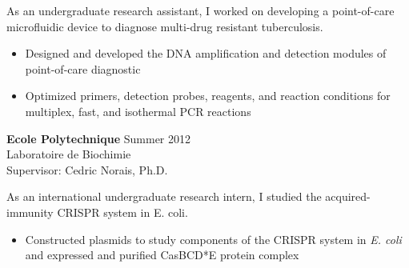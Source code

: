 \documentclass[10pt]{article}
\newenvironment{innerlist}[1][\enskip\textbullet]%
        {\begin{itemize}[#1,leftmargin=*,parsep=0pt,itemsep=0pt,topsep=0pt,partopsep=0pt]}
        {\end{itemize}}
\begin{document}
As an undergraduate research assistant, I worked on developing a point-of-care microfluidic device to diagnose multi-drug resistant tuberculosis. \\

\begin{innerlist}
\item{Designed and developed the DNA amplification and detection modules of point-of-care diagnostic}
\item{Optimized primers, detection probes, reagents, and reaction conditions for multiplex, fast, and isothermal PCR reactions}
\end{innerlist}

\vspace{.15in}
\textbf{Ecole Polytechnique} \hfill {Summer 2012}\\
Laboratoire de Biochimie\\
Supervisor: Cedric Norais, Ph.D.
	\vspace{0.1in}

As an international undergraduate research intern, I studied the acquired-immunity CRISPR system in E. coli. \\

\begin{innerlist}
\item{Constructed plasmids to study components of the CRISPR system in \textit{E. coli} and expressed and purified CasBCD*E protein complex}
\end{innerlist}
\end{document}
